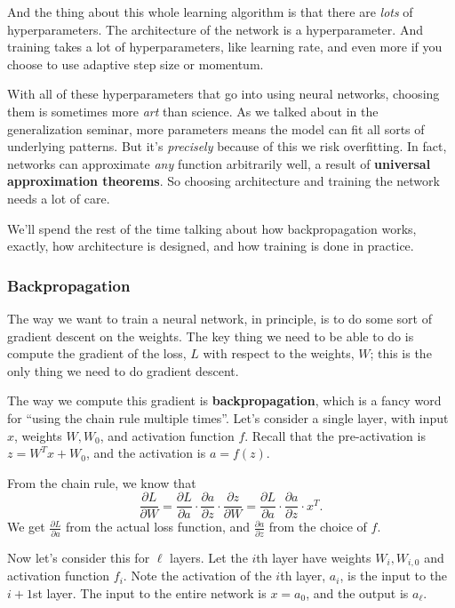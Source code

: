 \documentclass[11pt,paper=letter]{scrartcl}
\begin{document}
And the thing about this whole learning algorithm is that there are \textit{lots} of hyperparameters. The architecture of the network is a hyperparameter. And training takes a lot of hyperparameters, like learning rate, and even more if you choose to use adaptive step size or momentum.

With all of these hyperparameters that go into using neural networks, choosing them is sometimes more \textit{art} than science. As we talked about in the generalization seminar, more parameters means the model can fit all sorts of underlying patterns. But it's \textit{precisely} because of this we risk overfitting. In fact, networks can approximate \textit{any} function arbitrarily well, a result of \textbf{universal approximation theorems}. So choosing architecture and training the network needs a lot of care.

We'll spend the rest of the time talking about how backpropagation works, exactly, how architecture is designed, and how training is done in practice.

\subsubsection*{Backpropagation}

The way we want to train a neural network, in principle, is to do some sort of gradient descent on the weights. The key thing we need to be able to do is compute the gradient of the loss, $L$ with respect to the weights, $W$; this is the only thing we need to do gradient descent.

The way we compute this gradient is \textbf{backpropagation}, which is a fancy word for ``using the chain rule multiple times''. Let's consider a single layer, with input $x$, weights $W, W_0$, and activation function $f$. Recall that the pre-activation is $z = W^Tx + W_0$, and the activation is $a = f(z)$.

From the chain rule, we know that \[
  \frac{\partial L}{\partial W} = \frac{\partial L}{\partial a} \cdot \frac{\partial a}{\partial z} \cdot \frac{\partial z}{\partial W} = \frac{\partial L}{\partial a} \cdot \frac{\partial a}{\partial z} \cdot x^T.
\]
We get $\frac{\partial L}{\partial a}$ from the actual loss function, and $\frac{\partial a}{\partial z}$ from the choice of $f$.

Now let's consider this for $\ell$ layers. Let the $i$th layer have weights $W_i, W_{i, 0}$ and activation function $f_i$. Note the activation of the $i$th layer, $a_i$, is the input to the $i+1$st layer. The input to the entire network is $x = a_0$, and the output is $a_\ell$.
\end{document}
